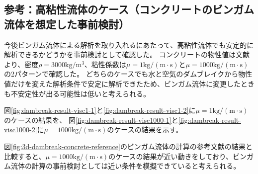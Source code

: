\subsection{参考：高粘性流体のケース（コンクリートのビンガム流体を想定した事前検討）}
今後ビンガム流体による解析を取り入れるにあたって、高粘性流体でも安定的に解析できるかどうかを事前検討として確認した。
コンクリートの物性値は文献\cite{Saito2012}より、密度$\rho=3000\mathrm{kg/m^3}$、粘性係数は$\mu = 1 \mathrm{kg/(m\cdot s)}$と$\mu=1000 \mathrm{kg/(m\cdot s)}$の2パターンで確認した。
どちらのケースでも水と空気のダムブレイクから物性値だけを変えた解析条件で安定に解析できたため、ビンガム流体に変更したときも不安定性が出る可能性は低いと考えられる。

図\ref{fig:dambreak-result-visc1-1}と\ref{fig:dambreak-result-visc1-2}に$\mu = 1 \mathrm{kg/(m\cdot s)}$のケースの結果を、
図\ref{fig:dambreak-result-visc1000-1}と\ref{fig:dambreak-result-visc1000-2}に$\mu = 1000 \mathrm{kg/(m\cdot s)}$のケースの結果を示す。

図\ref{fig:3d-dambreak-concrete-reference}のビンガム流体の計算の参考文献の結果\cite{Saito2012}と比較すると、$\mu = 1000 \mathrm{kg/(m\cdot s)}$のケースの結果が近い動きをしており、ビンガム流体の計算の事前検討としては近い条件を模擬できていると考えられる。

